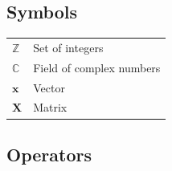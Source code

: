 \documentclass[english,12pt,a4paper,pdftex,sci,utf8]{aaltothesis}
\begin{document}
\makecoverpage



\begin{abstractpage}[english]
 \end{abstractpage}


\newpage







\thesistableofcontents



\subsection*{Symbols}

\begin{tabular}{ll}
$\mathbb{Z}$  & Set of integers \\
$\mathbb{C}$  & Field of complex numbers \\
$\mathbf{x}$  & Vector \\
$\mathbf{X}$  & Matrix \\
\end{tabular}

\subsection*{Operators}
\end{document}
